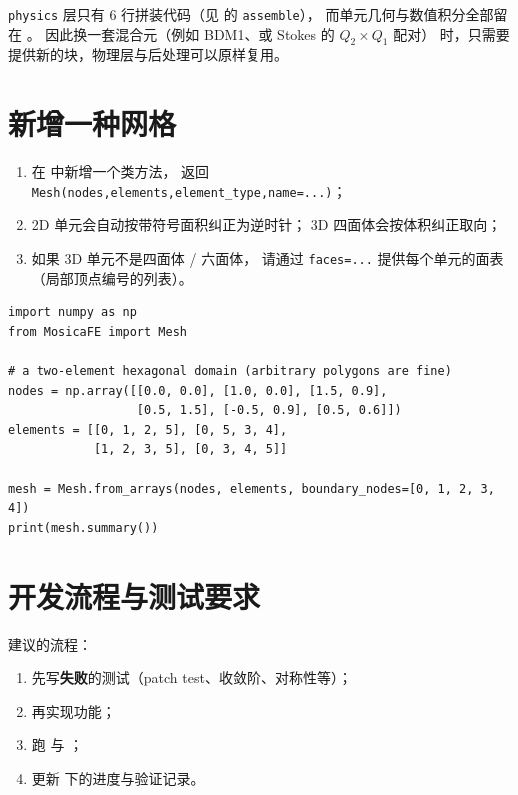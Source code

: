 \documentclass[UTF8,11pt,oneside]{ctexbook}
\theoremstyle{definition}
\theoremstyle{plain}
\newenvironment{important}{%
  \begin{tcolorbox}[colback=blue!5,colframe=blue!45,title=要点,fonttitle=\bfseries]%
}{%
  \end{tcolorbox}%
}
\newcommand{\code}[1]{\texttt{#1}}
\begin{document}
\begin{important}
\code{physics} 层只有 6 行拼装代码（见
 的 \code{assemble}），
而单元几何与数值积分全部留在 。
因此换一套混合元（例如 BDM1、或 Stokes 的 $Q_2\times Q_1$ 配对）
时，只需要提供新的块，物理层与后处理可以原样复用。
\end{important}

\section{新增一种网格}

\begin{enumerate}[label=(\arabic*),itemsep=0.2em]
  \item 在  中新增一个类方法，
        返回 \code{Mesh(nodes,\allowbreak  elements,\allowbreak  element\_\allowbreak type,\allowbreak  name=...)}；
  \item 2D 单元会自动按带符号面积纠正为逆时针；
        3D 四面体会按体积纠正取向；
  \item 如果 3D 单元不是四面体 / 六面体，
        请通过 \code{faces=...} 提供每个单元的面表（局部顶点编号的列表）。
\end{enumerate}

\begin{lstlisting}[language=MosicaFE,caption={示例 12.3：自定义单元形状}]
import numpy as np
from MosicaFE import Mesh

# a two-element hexagonal domain (arbitrary polygons are fine)
nodes = np.array([[0.0, 0.0], [1.0, 0.0], [1.5, 0.9],
                  [0.5, 1.5], [-0.5, 0.9], [0.5, 0.6]])
elements = [[0, 1, 2, 5], [0, 5, 3, 4],
            [1, 2, 3, 5], [0, 3, 4, 5]]

mesh = Mesh.from_arrays(nodes, elements, boundary_nodes=[0, 1, 2, 3, 4])
print(mesh.summary())
\end{lstlisting}

\section{开发流程与测试要求}

建议的流程：

\begin{enumerate}[label=(\arabic*),itemsep=0.2em]
  \item 先写\textbf{失败}的测试（patch test、收敛阶、对称性等）；
  \item 再实现功能；
  \item 跑  与 ；
  \item 更新  下的进度与验证记录。
\end{enumerate}
\end{document}
